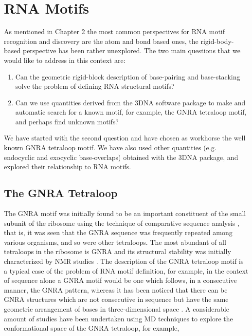 \chapter{RNA Motifs}
\label{motifs} 

As mentioned in  Chapter 2 the most common  perspectives for RNA motif
recognition  and  discovery are  the  atom  and  bond based  ones, the
rigid-body-based perspective has been  rather unexplored. The two main
questions that we would like to address in this context are:

\begin{enumerate}
\item{Can  the geometric rigid-block  description of  base-pairing and
  base-stacking solve the problem of defining RNA structural motifs?}
\item{Can we use quantities derived  from the 3DNA software package to
  make and automatic  search for a known motif,  for example, the GNRA
  tetraloop motif, and perhaps find unknown motifs?}
\end{enumerate}

We have started with the  second question and have chosen as workhorse
the  well  known  GNRA  tetraloop  motif.  We  have  also  used  other
quantities  (e.g.  endocyclic  and  exocyclic base-overlaps)  obtained
with  the  3DNA \cite{lu2003,  lu2008b}  package,  and explored  their
relationship to RNA motifs.

\section{The GNRA Tetraloop}
The GNRA motif  was initially found to be  an important constituent of
the small subunit  of the ribosome using the  technique of comparative
sequence analysis \cite{woese1990}, that is, it was seen that the GNRA
sequence was frequently repeated  among various organisms, and so were
other tetraloops. The most abundant  of all tetraloops in the ribosome
is GNRA  and its structural  stability was initially  characterized by
NMR studies  \cite{pardi1991}. The  description of the  GNRA tetraloop
motif is  a typical case of  the problem of RNA  motif definition, for
example, in  the context of sequence  alone a GNRA motif  would be one
which follows, in  a consecutive manner, the GNRA  pattern, whereas it
has  been noticed  that there  can be  GNRA structures  which  are not
consecutive  in sequence but  have the  same geometric  arrangement of
bases in  three-dimensional space \cite{lemieux2006}.   A considerable
amount of studies \cite{depaul2010, sorin2002} have been undertaken using
MD  techniques  to  explore  the  conformational  space  of  the  GNRA
tetraloop, for example,




